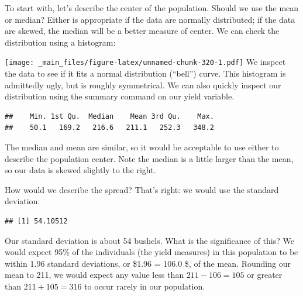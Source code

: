 \documentclass[
]{book}
\newenvironment{Shaded}{\begin{snugshade}}{\end{snugshade}}
\newcommand{\FunctionTok}[1]{\textcolor[rgb]{0.00,0.00,0.00}{#1}}
\newcommand{\NormalTok}[1]{#1}
\newcommand{\SpecialCharTok}[1]{\textcolor[rgb]{0.00,0.00,0.00}{#1}}
\begin{document}
To start with, let's describe the center of the population. Should we use the mean or median? Either is appropriate if the data are normally distributed; if the data are skewed, the median will be a better measure of center. We can check the distribution using a histogram:

\begin{Shaded}
\end{Shaded}

\texttt{[image: \_main\_files/figure-latex/unnamed-chunk-320-1.pdf]}
We inspect the data to see if it fits a normal distribution (``bell'') curve. This histogram is admittedly ugly, but is roughly symmetrical. We can also quickly inspect our distribution using the summary command on our yield variable.

\begin{Shaded}
\end{Shaded}

\begin{verbatim}
##    Min. 1st Qu.  Median    Mean 3rd Qu.    Max. 
##    50.1   169.2   216.6   211.1   252.3   348.2
\end{verbatim}

The median and mean are similar, so it would be acceptable to use either to describe the population center. Note the median is a little larger than the mean, so our data is skewed slightly to the right.

How would we describe the spread? That's right: we would use the standard deviation:

\begin{Shaded}
\end{Shaded}

\begin{verbatim}
## [1] 54.10512
\end{verbatim}

Our standard deviation is about 54 bushels. What is the significance of this? We would expect 95\% of the individuals (the yield measures) in this population to be within 1.96 standard deviations, or \$1.96  = 106.0 \$, of the mean. Rounding our mean to 211, we would expect any value less than \(211 - 106 = 105\) or greater than \(211 + 105 = 316\) to occur rarely in our population.
\end{document}
